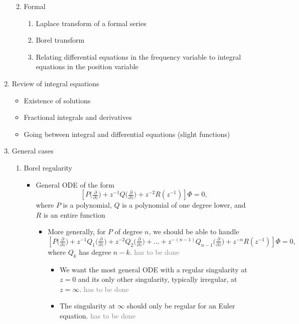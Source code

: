 \documentclass{article}
\begin{document}
\begin{enumerate}
\begin{enumerate}
\begin{enumerate}
\end{enumerate}
\item Formal
\begin{enumerate}
\item Laplace transform of a formal series
\item Borel transform
\item Relating differential equations in the frequency variable to integral equations in the position variable
\end{enumerate}
\end{enumerate}
\item Review of integral equations
\begin{itemize}
\item Existence of solutions
\item Fractional integrals and derivatives
\item Going between integral and differential equations (slight functions)
\end{itemize}
\item General cases
\begin{enumerate}
\item Borel regularity
\begin{itemize}
\item General ODE of the form
\[ \left[ P\big(\tfrac{\partial}{\partial z}\big) + z^{-1} Q\big(\tfrac{\partial}{\partial z}\big) + z^{-2} R(z^{-1}) \right] \Phi = 0, \]
where $P$ is a polynomial, $Q$ is a polynomial of one degree lower, and $R$ is an entire function~
\begin{itemize}
\color{DarkCyan}
\item More generally, for $P$ of degree $n$, we should be able to handle
\[ \left[ P\big(\tfrac{\partial}{\partial z}\big) + z^{-1} Q_1\big(\tfrac{\partial}{\partial z}\big) + z^{-2} Q_2\big(\tfrac{\partial}{\partial z}\big) + \ldots + z^{-(n-1)} Q_{n-1}\big(\tfrac{\partial}{\partial z}\big) + z^{-n} R(z^{-1}) \right] \Phi = 0, \]
where $Q_k$ has degree $n-k$. \textcolor{gray}{has to be done}
\begin{itemize}
\item We want the most general ODE with a regular singularity at $z = 0$ and its only other singularity, typically irregular, at $z = \infty$. \textcolor{gray}{has to be done}
\item The singularity at $\infty$ should only be regular for an Euler equation. \textcolor{gray}{has to be done}
\end{itemize}

\end{itemize}
\end{itemize}
\end{enumerate}
\end{enumerate}
\end{document}
